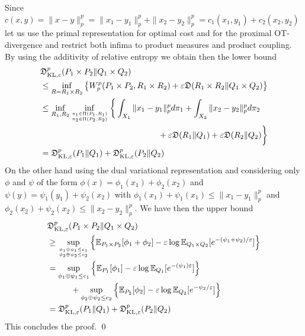 \documentclass{amsart}
\theoremstyle{definition}
\theoremstyle{remark}
\numberwithin{equation}{section}
\begin{document}
Since $c(x,y)=\|x-y\|_p^p=\|x_1-y_1\|_p^p + \|x_2-y_2\|_p^p=c_1(x_1,y_1)+c_2(x_2,y_2)$ let us use the primal representation for optimal cost and for the proximal OT-divergence and restrict both infima to product measures and product coupling.  By using the additivity of relative entropy we obtain then the lower bound
\begin{equation}
\begin{aligned}
& \mathfrak{D}^{p}_{\textrm{KL},\varepsilon}( P_1 \times P_2  \| Q_1\times Q_2) \\ &\le \inf_{R=R_1\times R_2} \left\{W_p^p( P_1 \times P_2, R_1 \times R_2) + \varepsilon \mathfrak{D}(R_1 \times R_2\| Q_1\times Q_2) \right\}\\
&\le \inf_{ R_1, R_2}  \inf_{\pi_1 \in \Pi(P_1,R_1) \atop
\pi_2 \in \Pi(P_2,R_2) } 
\bigg{\{}\int_{X_1} \|x_1-y_1\|_p^p  d\pi_1 + \int_{X_2} \|x_2-y_2\|_p^p  d\pi_2  \\
& \hspace{5cm}  + \varepsilon \mathfrak{D}(R_1 \|Q_1) + \varepsilon \mathfrak{D}( R_2\|  Q_2) \bigg{\}} \\
&=   \mathfrak{D}^{p}_{\textrm{KL},\varepsilon}( P_1  \| Q_1 ) +   \mathfrak{D}^{p}_{\textrm{KL},\varepsilon}( P_2  \| Q_2 )
\end{aligned}
\end{equation}
On the other hand using the dual variational representation and considering  only  $\phi$ and $\psi$  of the form $\phi(x)=\phi_1(x_1)+ \phi_2(x_2)$ and 
$\psi(y)=\psi_1(y_1)+ \psi_2(x_2)$  with  $\phi_1(x_1)+\psi_1(x_1) \le \|x_1-y_1\|_p^p$ and $\phi_2(x_2)+\psi_2(x_2) \le \|x_2-y_2\|_p^p$. We have then the upper bound
\begin{equation}
\begin{aligned}
& \mathfrak{D}^{p}_{\textrm{KL},\varepsilon}( P_1 \times P_2  \| Q_1\times Q_2) \\ &\ge \sup_{\phi_1 \oplus \psi_1 \le c_1 \atop \phi_2 \oplus \psi_2 \le c_2  } \left\{ \mathbb{E}_{P_1 \times P_2}[\phi_1 + \phi_2]  - \varepsilon
\log \mathbb{E}_{Q_1 \times Q_2} [ e^{-(\psi_1+\psi_2)/\varepsilon}]\right\} 
\\
&= \sup_{\phi_1 \oplus \psi_1 \le c_1 } \left\{ \mathbb{E}_{P_1}[\phi_1]   - \varepsilon
\log \mathbb{E}_{Q_1}  [ e^{-(\psi_1)\varepsilon}] \right\} \\
& \hspace{1cm} + \sup_{ \phi_2 \oplus \psi_2 \le c_2  } \left\{ \mathbb{E}_{P_2}[ \phi_2]  - \varepsilon
\log \mathbb{E}_{Q_2} [ e^{-\psi_2/\varepsilon}] \right\}
\\
&=   \mathfrak{D}^{p}_{\textrm{KL},\varepsilon}( P_1  \| Q_1 ) +   \mathfrak{D}^{p}_{\textrm{KL},\varepsilon}( P_2  \| Q_2 )
\end{aligned}
\end{equation}
This concludes the proof. \qed
\end{document}
